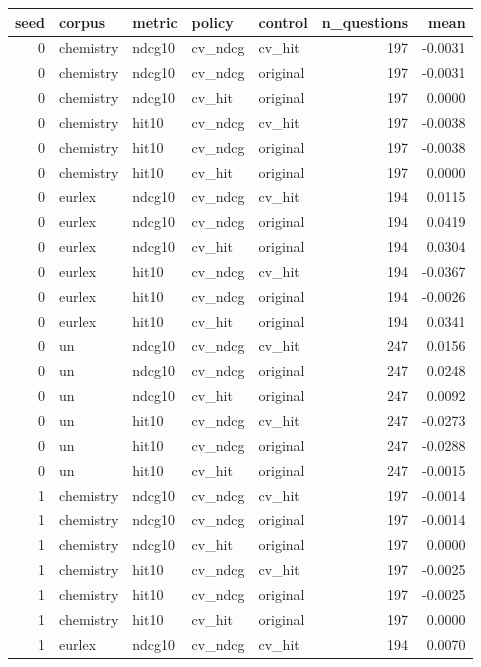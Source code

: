 \begin{tabular}{rllllrr}
\toprule
seed & corpus & metric & policy & control & n\_questions & mean \\
\midrule
0 & chemistry & ndcg10 & cv\_ndcg & cv\_hit & 197 & -0.0031 \\
0 & chemistry & ndcg10 & cv\_ndcg & original & 197 & -0.0031 \\
0 & chemistry & ndcg10 & cv\_hit & original & 197 & 0.0000 \\
0 & chemistry & hit10 & cv\_ndcg & cv\_hit & 197 & -0.0038 \\
0 & chemistry & hit10 & cv\_ndcg & original & 197 & -0.0038 \\
0 & chemistry & hit10 & cv\_hit & original & 197 & 0.0000 \\
0 & eurlex & ndcg10 & cv\_ndcg & cv\_hit & 194 & 0.0115 \\
0 & eurlex & ndcg10 & cv\_ndcg & original & 194 & 0.0419 \\
0 & eurlex & ndcg10 & cv\_hit & original & 194 & 0.0304 \\
0 & eurlex & hit10 & cv\_ndcg & cv\_hit & 194 & -0.0367 \\
0 & eurlex & hit10 & cv\_ndcg & original & 194 & -0.0026 \\
0 & eurlex & hit10 & cv\_hit & original & 194 & 0.0341 \\
0 & un & ndcg10 & cv\_ndcg & cv\_hit & 247 & 0.0156 \\
0 & un & ndcg10 & cv\_ndcg & original & 247 & 0.0248 \\
0 & un & ndcg10 & cv\_hit & original & 247 & 0.0092 \\
0 & un & hit10 & cv\_ndcg & cv\_hit & 247 & -0.0273 \\
0 & un & hit10 & cv\_ndcg & original & 247 & -0.0288 \\
0 & un & hit10 & cv\_hit & original & 247 & -0.0015 \\
1 & chemistry & ndcg10 & cv\_ndcg & cv\_hit & 197 & -0.0014 \\
1 & chemistry & ndcg10 & cv\_ndcg & original & 197 & -0.0014 \\
1 & chemistry & ndcg10 & cv\_hit & original & 197 & 0.0000 \\
1 & chemistry & hit10 & cv\_ndcg & cv\_hit & 197 & -0.0025 \\
1 & chemistry & hit10 & cv\_ndcg & original & 197 & -0.0025 \\
1 & chemistry & hit10 & cv\_hit & original & 197 & 0.0000 \\
1 & eurlex & ndcg10 & cv\_ndcg & cv\_hit & 194 & 0.0070 \\

\end{tabular}
